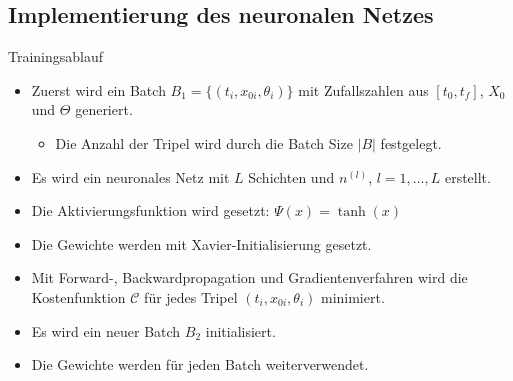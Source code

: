 \subsection{Implementierung des neuronalen Netzes}

\begin{frame}{Trainingsablauf}
    \begin{itemize}
        \item<1-> Zuerst wird ein Batch $B_1=\{(t_i,x_{0i},\theta_i)\}$ mit Zufallszahlen aus $[t_0,t_f]$, $X_0$ und $\Theta$
        generiert.
        \begin{itemize}
            \item<1-> Die Anzahl der Tripel wird durch die Batch Size $|B|$ festgelegt.
        \end{itemize}
        \item<2-> Es wird ein neuronales Netz mit $L$ Schichten und $n^{(l)}$, $l=1,\dots,L$ erstellt.
        \item<3-> Die Aktivierungsfunktion wird gesetzt: $\Psi(x)=\tanh(x)$
        \item<4-> Die Gewichte werden mit Xavier-Initialisierung gesetzt.
        \item<5-> Mit Forward-, Backwardpropagation und Gradientenverfahren wird die Kostenfunktion $\mathcal{C}$ für
        jedes Tripel $(t_i,x_{0i},\theta_i)$ minimiert.
        \item<6-> Es wird ein neuer Batch $B_2$ initialisiert.
        \item<7-> Die Gewichte werden für jeden Batch weiterverwendet.
    \end{itemize}
\end{frame}
